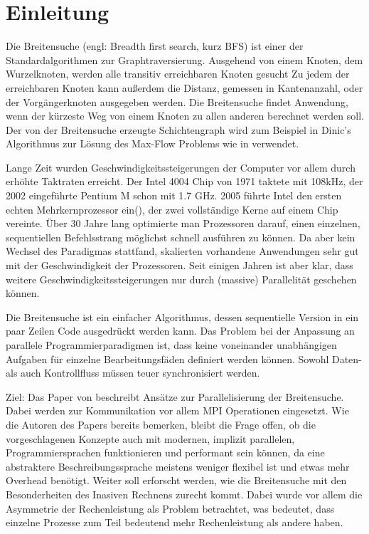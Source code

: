 \chapter{Einleitung}
\label{ch:einleitung}

Die Breitensuche (engl: Breadth first search, kurz BFS) ist einer der Standardalgorithmen zur Graphtraversierung. Ausgehend von einem Knoten, dem Wurzelknoten, werden alle transitiv erreichbaren Knoten gesucht Zu jedem der erreichbaren Knoten kann außerdem die Distanz, gemessen in Kantenanzahl, oder der Vorgängerknoten ausgegeben werden. Die Breitensuche findet Anwendung, wenn der kürzeste Weg von einem Knoten zu allen anderen berechnet werden soll. Der von der Breitensuche erzeugte Schichtengraph wird zum Beispiel in Dinic's Algorithmus zur Lösung des Max-Flow Problems wie in \cite{Dinitz:2006} verwendet. 

Lange Zeit wurden Geschwindigkeitssteigerungen der Computer vor allem durch erhöhte Taktraten erreicht. Der Intel 4004 Chip von 1971 taktete mit 108kHz, der 2002 eingeführte Pentium M schon mit 1.7 GHz. 2005 führte Intel den ersten echten Mehrkernprozessor ein(\cite{Intel:2006:Online}), der zwei vollständige Kerne auf einem Chip vereinte. Über 30 Jahre lang optimierte man Prozessoren darauf, einen einzelnen, sequentiellen Befehlsstrang möglichst schnell ausführen zu können. Da aber kein Wechsel des Paradigmas stattfand, skalierten vorhandene Anwendungen sehr gut mit der Geschwindigkeit der Prozessoren. Seit einigen Jahren ist aber klar, dass weitere Geschwindigkeitssteigerungen nur durch (massive) Parallelität geschehen können.  

Die Breitensuche ist ein einfacher Algorithmus, dessen sequentielle Version in ein paar Zeilen Code ausgedrückt werden kann. Das Problem bei der Anpassung an parallele Programmierparadigmen ist, dass keine voneinander unabhängigen Aufgaben für einzelne Bearbeitungsfäden definiert werden können. Sowohl Daten- als auch Kontrollfluss müssen teuer synchronisiert werden.


Ziel:
Das Paper von \cite{Buluc:2011} beschreibt Ansätze zur Parallelisierung der Breitensuche. Dabei werden zur Kommunikation vor allem MPI Operationen eingesetzt. Wie die Autoren des Papers bereits bemerken, bleibt die Frage offen, ob die vorgeschlagenen Konzepte auch mit modernen, implizit parallelen, Programmiersprachen funktionieren und performant sein können, da eine abstraktere Beschreibungssprache meistens weniger flexibel ist und etwas mehr Overhead benötigt. Weiter soll erforscht werden, wie die Breitensuche mit den Besonderheiten des Inasiven Rechnens zurecht kommt. Dabei wurde vor allem die Asymmetrie der Rechenleistung als Problem betrachtet, was bedeutet, dass einzelne Prozesse zum Teil bedeutend mehr Rechenleistung als andere haben.